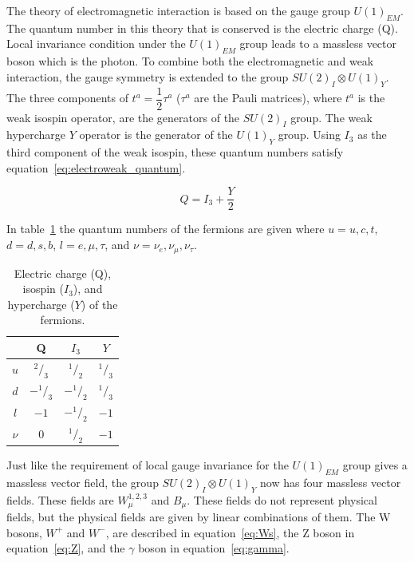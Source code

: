 The theory of electromagnetic interaction is based on the gauge group $U(1)_{EM}$.  The quantum number in this theory that is conserved is the electric charge (Q).  Local invariance condition under the $U(1)_{EM}$ group leads to a massless vector boson which is the photon.  To combine both the electromagnetic and weak interaction, the gauge symmetry is extended to the group $ S U(2)_{I} \otimes U(1)_{Y}$.  The three components of $t^{a} = \dfrac{1}{2}\tau^{a}$ ($\tau^{a}$ are the Pauli matrices), where $t^{a}$ is the weak isospin operator, are the generators of the $S U(2)_{I}$ group.  The weak hypercharge $Y$ operator is the generator of the $ U(1)_{Y}$ group. Using $I_{3}$ as the third component of the weak isospin, these quantum numbers satisfy equation~\ref{eq:electroweak_quantum}.

\begin{equation} Q = I_{3} + \dfrac{Y}{2} \label{eq:electroweak_quantum}\end{equation}

In table~\ref{tab:QuantumNumbers} the quantum numbers of the fermions are given where $u = u,c,t$, $d = d,s,b$, $l = e,\mu,\tau$, and $\nu = \nu_{e}, \nu_{\mu}, \nu_{\tau}$.


\begin{center}
\begin{table}[htb]
\caption{%
  \small Electric charge (Q), isospin ($I_{3}$), and hypercharge ($Y$) of the fermions.
}
\begin{center}
\begin{tabular}{ c c c c }
\hline & Q & $I_{3}$ & $Y$ \\ \hline \hline
$u$   & $^2/_3$  & $^1/_2$  & $^1/_3$ \\
$d$   & $-^1/_3$ & $-^1/_2$ & $^1/_3$ \\ \hline \hline
$l$   & $-1$            & $-^1/_2$ & $-1$ \\
$\nu$ & $0$             & $^1/_2$  & $-1$ \\
\hline
\end{tabular}
\end{center}
\label{tab:QuantumNumbers}
\end{table}

\end{center}

Just like the requirement of local gauge invariance for the $U(1)_{EM}$ group gives a massless vector field, the group $ S U(2)_{I} \otimes U(1)_{Y}$ now has four massless vector fields.  These fields are $W^{1,2,3}_{\mu}$ and $B_{\mu}$.  These fields do not represent physical fields, but the physical fields are given by linear combinations of them.  The W bosons, $W^+$ and $W^-$, are described in equation~\ref{eq:Ws}, the Z boson in equation~\ref{eq:Z}, and the $\gamma$ boson in equation~\ref{eq:gamma}.

